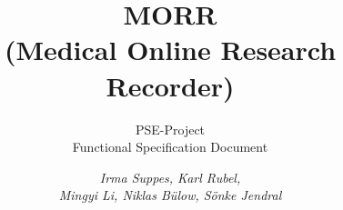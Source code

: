 \documentclass[parskip=full, 12pt, oneside]{scrbook}
\author{
	\textit{Irma Suppes, Karl Rubel, } \\ 
	\textit{Mingyi Li, Niklas Bülow, Sönke Jendral }
}
\title{MORR \\ (Medical Online Research Recorder)}
\subtitle{PSE-Project \\ Functional Specification Document}
\begin{document}
\newcommand{\requirementscope}[2]{\newcounter{counter#1}\expandafter\newcommand\csname #2\endcsname[2]{\addtocounter{counter#1}{10}\item[#1\arabic{counter#1}\phantomsection\label{#1\arabic{counter#1}}]{\textbf{##1}\\##2}}}
\newcommand{\specref}[1]{\hyperref[#1]{#1}}

\maketitle

\tableofcontents
\printnoidxglossaries
\end{document}
